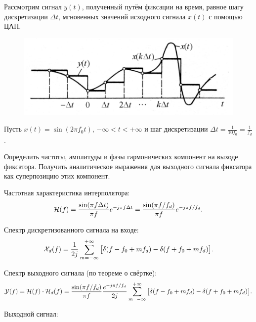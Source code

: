 \protect\thispagestyle{fancy}
\section{}
Рассмотрим сигнал $y(t)$, полученный путём фиксации на время, равное шагу дискретизации $\Delta t$, мгновенных значений исходного сигнала $x(t)$ с помощью ЦАП.

\begin{figure}[!h]
	\centering
	\includegraphics[width=0.5\columnwidth]{pics/fall/5/DAC.png}
	\label{fig:5-1}
\end{figure}

Пусть $x(t) = \sin(2\pi f_0 t)$, $-\infty < t < +\infty$ и шаг дискретизации $\Delta t = \frac{1}{10 f_0} = \frac{1}{f_d}$.

Определить частоты, амплитуды и фазы гармонических компонент на выходе фиксатора. Получить аналитическое выражения для выходного сигнала фиксатора как суперпозицию этих компонент.

Частотная характеристика интерполятора:
\begin{equation*}
	\mathcal{H}(f) = \dfrac{\sin(\pi f \Delta t)}{\pi f} e^{-j \pi f \Delta t} = 
	\dfrac{\sin(\pi f/f_d)}{\pi f} e^{-j \pi f / f_d}.
\end{equation*}

Спектр дискретизованного сигнала на входе:
\begin{equation*}
	\mathcal{X}_{d}(f) = \dfrac{1}{2j} \sum \limits_{m = -\infty}^{+\infty} 
	\big[\delta(f - f_0 + m f_d) - \delta(f + f_0 + m f_d)\big].
\end{equation*}

Спектр выходного сигнала (по теореме о свёртке):
\begin{equation*}
	\mathcal{Y}(f) = \mathcal{H}(f) \cdot \mathcal{H}_{d}(f) = \dfrac{\sin(\pi f/f_d)}{\pi f} \dfrac{e^{-j \pi f / f_d}}{2 j} \sum \limits_{m = -\infty}^{+\infty} 
	\big[\delta(f - f_0 + m f_d) - \delta(f + f_0 + m f_d)\big].
\end{equation*}

Выходной сигнал:

